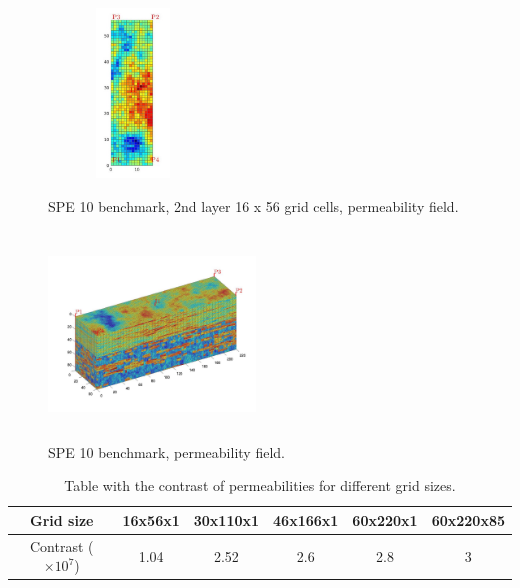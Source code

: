 \documentclass[12pt]{article}
\begin{document}
\begin{figure}[!h]
\centering
\begin{minipage}{.4\textwidth}
 \centering
\includegraphics[width=4.5cm,height=4.5cm,keepaspectratio]
{perm_layer_2.jpg}
\caption{SPE 10 benchmark, 2nd layer 16 x 56 grid cells, permeability field.}
\label{fig:permc}
\end{minipage}%
\hspace{4mm}
\begin{minipage}{.4\textwidth}
 \centering
\includegraphics[width=5.5cm,height=5.5cm,keepaspectratio]
{perm_layer_.jpg}
\caption{SPE 10 benchmark, permeability field.}
\label{fig:permcc}
\end{minipage}
\end{figure}


\begin{table}[!ht]
\centering
\begin{tabular}{ |c|c|c|c|c|c|  } 
 \hline
  Grid size & 16x56x1& 30x110x1& 46x166x1& 60x220x1&60x220x85\\
  \hline
  Contrast ($\times10^{7}$) & 1.04 & 2.52&  2.6&  2.8 &3\\ 
\hline
\end{tabular}
\caption{Table with the contrast of permeabilities for
different grid sizes.}
\label{table:permgs}
\end{table}
\end{document}
